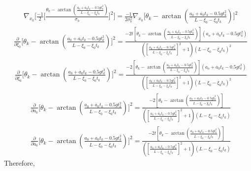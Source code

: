 \documentclass[11pt]{article}
\begin{document}
\begin{enumerate}[label=\alph*)]
\begin{align*}
    &\nabla_{x_0}\Big[\frac{-1}{2}\Big[\frac{\theta_k - \arctan(\frac{a_0 + \dot{a_0}t_k - 0.5gt_k^2}{L-\xi_0-\dot{\xi_0}t_k})}{\sigma_b}\Big]^2\Big]
    = \frac{-1}{2\sigma_b^2} \nabla_{x_0} \Big[\theta_k - \arctan(\frac{a_0 + \dot{a_0}t_k - 0.5gt_k^2}{L-\xi_0-\dot{\xi_0}t_k})\Big]^2
\end{align*}
\begin{align*}
    &\frac{\partial}{\partial \xi_0} \Big[\theta_k - \arctan(\frac{a_0 + \dot{a_0}t_k - 0.5gt_k^2}{L-\xi_0-\dot{\xi_0}t_k})\Big]^2 
    = \frac{-2t[\theta_k - \arctan(\frac{a_0 + \dot{a_0}t_k - 0.5gt_k^2}{L-\xi_0-\dot{\xi_0}t_k})](a_o+\dot{a_0}t_k-0.5gt_k^2)}{([\frac{a_0 + \dot{a_0}t_k - 0.5gt_k^2}{L-\xi_0-\dot{\xi_0}t_k}]^2 + 1)(L-\xi_0-\dot{\xi_0}t_k)^2}
\end{align*}
\begin{align*}
    &\frac{\partial}{\partial \dot{\xi_0}} \Big[\theta_k - \arctan(\frac{a_0 + \dot{a_0}t_k - 0.5gt_k^2}{L-\xi_0-\dot{\xi_0}t_k})\Big]^2 
    = \frac{-2[\theta_k - \arctan(\frac{a_0 + \dot{a_0}t_k - 0.5gt_k^2}{L-\xi_0-\dot{\xi_0}t_k})](a_o+\dot{a_0}t_k-0.5gt_k^2)}{([\frac{a_0 + \dot{a_0}t_k - 0.5gt_k^2}{L-\xi_0-\dot{\xi_0}t_k}]^2 + 1)(L-\xi_0-\dot{\xi_0}t_k)^2}
\end{align*}
\begin{align*}
    &\frac{\partial}{\partial a_0} \Big[\theta_k - \arctan(\frac{a_0 + \dot{a_0}t_k - 0.5gt_k^2}{L-\xi_0-\dot{\xi_0}t_k})\Big]^2 
    = \frac{-2[\theta_k - \arctan(\frac{a_0 + \dot{a_0}t_k - 0.5gt_k^2}{L-\xi_0-\dot{\xi_0}t_k})]}{([\frac{a_0 + \dot{a_0}t_k - 0.5gt_k^2}{L-\xi_0-\dot{\xi_0}t_k}]^2 + 1)(L-\xi_0-\dot{\xi_0}t_k)}
\end{align*}
\begin{align*}
    &\frac{\partial}{\partial \dot{a_0}} \Big[\theta_k - \arctan(\frac{a_0 + \dot{a_0}t_k - 0.5gt_k^2}{L-\xi_0-\dot{\xi_0}t_k})\Big]^2
    = \frac{-2t[\theta_k - \arctan(\frac{a_0 + \dot{a_0}t_k - 0.5gt_k^2}{L-\xi_0-\dot{\xi_0}t_k})]}{([\frac{a_0 + \dot{a_0}t_k - 0.5gt_k^2}{L-\xi_0-\dot{\xi_0}t_k}]^2 + 1)(L-\xi_0-\dot{\xi_0}t_k)}
\end{align*}
\newpage
Therefore,


\end{enumerate}
\end{document}
